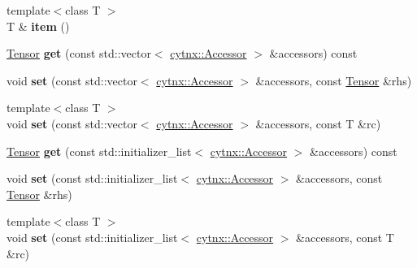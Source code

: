 \begin{DoxyCompactItemize}
\item 
\mbox{\label{classcytnx_1_1Tensor_a7b686c6641c3c1eeb2d34cb7c09e433b}} 
{\footnotesize template$<$class T $>$ }\\T \& {\bfseries item} ()
\item 
\mbox{\label{classcytnx_1_1Tensor_ad7b928e4cb89d40cbd99aefab9aa0075}} 
\hyperlink{classcytnx_1_1Tensor}{Tensor} {\bfseries get} (const std\+::vector$<$ \hyperlink{classcytnx_1_1Accessor}{cytnx\+::\+Accessor} $>$ \&accessors) const
\item 
\mbox{\label{classcytnx_1_1Tensor_a771f1f5b51f89abd8df4166e602214ac}} 
void {\bfseries set} (const std\+::vector$<$ \hyperlink{classcytnx_1_1Accessor}{cytnx\+::\+Accessor} $>$ \&accessors, const \hyperlink{classcytnx_1_1Tensor}{Tensor} \&rhs)
\item 
\mbox{\label{classcytnx_1_1Tensor_ad93d654b978add6b2f0dfb9f91490209}} 
{\footnotesize template$<$class T $>$ }\\void {\bfseries set} (const std\+::vector$<$ \hyperlink{classcytnx_1_1Accessor}{cytnx\+::\+Accessor} $>$ \&accessors, const T \&rc)
\item 
\mbox{\label{classcytnx_1_1Tensor_ac32f5b8921f39924abb2036ee1877884}} 
\hyperlink{classcytnx_1_1Tensor}{Tensor} {\bfseries get} (const std\+::initializer\+\_\+list$<$ \hyperlink{classcytnx_1_1Accessor}{cytnx\+::\+Accessor} $>$ \&accessors) const
\item 
\mbox{\label{classcytnx_1_1Tensor_a666a2352ca3b632cb8569e5013b50058}} 
void {\bfseries set} (const std\+::initializer\+\_\+list$<$ \hyperlink{classcytnx_1_1Accessor}{cytnx\+::\+Accessor} $>$ \&accessors, const \hyperlink{classcytnx_1_1Tensor}{Tensor} \&rhs)
\item 
\mbox{\label{classcytnx_1_1Tensor_ac04c49c32bd11a66f192ad77b5710e0a}} 
{\footnotesize template$<$class T $>$ }\\void {\bfseries set} (const std\+::initializer\+\_\+list$<$ \hyperlink{classcytnx_1_1Accessor}{cytnx\+::\+Accessor} $>$ \&accessors, const T \&rc)
\item 
\mbox{\label{classcytnx_1_1Tensor_a0fd5918a0f64ebd74fe34cb8b8164c30}} 

\end{DoxyCompactItemize}

